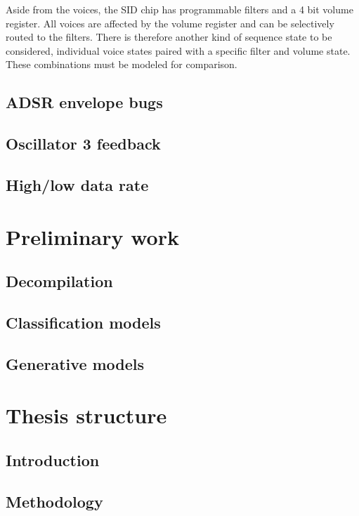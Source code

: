 \documentclass[10pt]{article}
\begin{document}
\begin{multicols*}{2}
  Aside from the voices, the SID chip has programmable filters and a 4
  bit volume register. All voices are affected by the volume register
  and can be selectively routed to the filters. There is therefore
  another kind of sequence state to be considered, individual voice
  states paired with a specific filter and volume state. These
  combinations must be modeled for comparison.

  \subsection{ADSR envelope bugs}

  \subsection{Oscillator 3 feedback}

  \subsection{High/low data rate}

  \section{Preliminary work}

  \subsection{Decompilation}

  \subsection{Classification models}

  \subsection{Generative models}

  \section{Thesis structure}

  \subsection{Introduction}

  \subsection{Methodology}


\end{multicols*}
\end{document}
